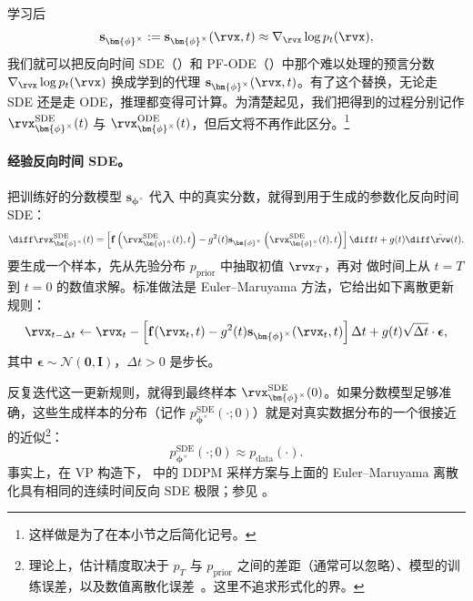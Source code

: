 学习后
\[
\mathbf{s}_{\bm{\phi}^\times} := \mathbf{s}_{\bm{\phi}^\times}(\rvx, t) \approx \nabla_{\rvx} \log p_t(\rvx),
\]
我们就可以把反向时间 SDE（）和 PF-ODE（）中那个难以处理的预言分数 $\nabla_{\rvx} \log p_t(\rvx)$ 换成学到的代理 $\mathbf{s}_{\bm{\phi}^\times}(\rvx, t)$。有了这个替换，无论走 SDE 还是走 ODE，推理都变得可计算。为清楚起见，我们把得到的过程分别记作 $\rvx^{\mathrm{SDE}}_{\bm{\phi}^\times}(t)$ 与 $\rvx^{\mathrm{ODE}}_{\bm{\phi}^\times}(t)$，但后文将不再作此区分。\footnote{这样做是为了在本小节之后简化记号。}

\paragraph{经验反向时间 SDE。}
把训练好的分数模型 $\mathbf{s}_{\bm{\phi}^\times}$ 代入  中的真实分数，就得到用于生成的参数化反向时间 SDE：
\begin{equation}\label{eq:sde_backward_sub}
    \diff \rvx^{\mathrm{SDE}}_{\bm{\phi}^\times}(t) = \left[\mathbf{f}\left(\rvx^{\mathrm{SDE}}_{\bm{\phi}^\times}(t), t\right) - g^2(t) \mathbf{s}_{\bm{\phi}^\times}\left(\rvx^{\mathrm{SDE}}_{\bm{\phi}^\times}(t), t\right) \right] \diff t + g(t) \diff \bar{\rvw}(t).
\end{equation}
要生成一个样本，先从先验分布 $p_{\mathrm{prior}}$ 中抽取初值 $\rvx_T$，再对  做时间上从 $t=T$ 到 $t=0$ 的数值求解。标准做法是 Euler--Maruyama 方法，它给出如下离散更新规则：
\begin{equation}\label{eq:euler-maruyama}
\rvx_{t - \Delta t} \leftarrow \rvx_t - \left[ \mathbf{f}(\rvx_t, t) - g^2(t)  \mathbf{s}_{\bm{\phi}^\times}(\rvx_t, t) \right] \Delta t + g(t) \sqrt{\Delta t} \cdot \boldsymbol{\epsilon},
\end{equation}
其中 $\boldsymbol{\epsilon} \sim \mathcal{N}(\bm{0}, \mathbf{I})$，$\Delta t > 0$ 是步长。

反复迭代这一更新规则，就得到最终样本 $\rvx^{\mathrm{SDE}}_{\bm{\phi}^\times}(0)$。如果分数模型足够准确，这些生成样本的分布（记作 $p_{\bm{\phi}^\times}^{\mathrm{SDE}}(\cdot; 0)$）就是对真实数据分布的一个很接近的近似\footnote{理论上，估计精度取决于 $p_T$ 与 $p_{\mathrm{prior}}$ 之间的差距（通常可以忽略）、模型的训练误差，以及数值离散化误差~\citep{de2022convergence,wang2024evaluating}。这里不追求形式化的界。}：
\[
p_{\bm{\phi}^\times}^{\mathrm{SDE}}(\cdot; 0) \approx p_{\mathrm{data}}(\cdot).
\]
事实上，在 VP 构造下， 中的 DDPM 采样方案与上面的 Euler--Maruyama 离散化具有相同的连续时间反向 SDE 极限；参见 。

